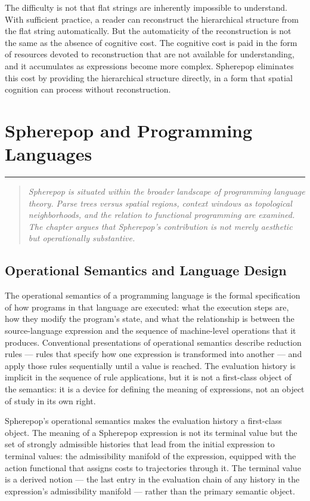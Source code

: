 \documentclass[12pt,openany]{book}
\theoremstyle{plain}
\theoremstyle{definition}
\theoremstyle{remark}
\newcommand{\chapterrule}{%
  \vspace{4pt}%
  {\color{SpherepopBlue}\rule{\textwidth}{0.8pt}}%
  \vspace{10pt}%
}
\newenvironment{chapterprecis}{%
  \begin{quote}\small\itshape}{%
  \end{quote}\medskip}
\begin{document}
The difficulty is not that flat strings are inherently impossible to understand. With sufficient practice, a reader can reconstruct the hierarchical structure from the flat string automatically. But the automaticity of the reconstruction is not the same as the absence of cognitive cost. The cognitive cost is paid in the form of resources devoted to reconstruction that are not available for understanding, and it accumulates as expressions become more complex. Spherepop eliminates this cost by providing the hierarchical structure directly, in a form that spatial cognition can process without reconstruction.

\chapter{Spherepop and Programming Languages}
\chapterrule

\begin{chapterprecis}
Spherepop is situated within the broader landscape of programming
language theory. Parse trees versus spatial regions, context
windows as topological neighborhoods, and the relation to
functional programming are examined. The chapter argues that
Spherepop's contribution is not merely aesthetic but
operationally substantive.
\end{chapterprecis}

\section{Operational Semantics and Language Design}

The operational semantics of a programming language is the formal specification of how programs in that language are executed: what the execution steps are, how they modify the program's state, and what the relationship is between the source-language expression and the sequence of machine-level operations that it produces. Conventional presentations of operational semantics describe reduction rules — rules that specify how one expression is transformed into another — and apply those rules sequentially until a value is reached. The evaluation history is implicit in the sequence of rule applications, but it is not a first-class object of the semantics: it is a device for defining the meaning of expressions, not an object of study in its own right.

Spherepop's operational semantics makes the evaluation history a first-class object. The meaning of a Spherepop expression is not its terminal value but the set of strongly admissible histories that lead from the initial expression to terminal values: the admissibility manifold of the expression, equipped with the action functional that assigns costs to trajectories through it. The terminal value is a derived notion — the last entry in the evaluation chain of any history in the expression's admissibility manifold — rather than the primary semantic object.
\end{document}
